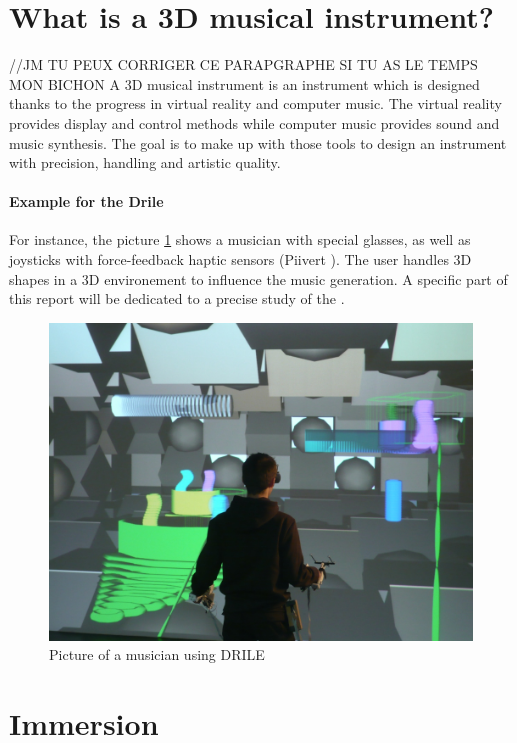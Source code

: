 \newpage
\section{What is a 3D musical instrument?}
//JM TU PEUX CORRIGER CE PARAPGRAPHE SI TU AS LE TEMPS MON BICHON
A 3D musical instrument is an instrument which is designed thanks to the progress in virtual reality and computer music.
The virtual reality provides display and control methods while computer music provides sound and music synthesis. The goal is to make up with those tools to design an instrument with precision, handling and artistic quality.

\paragraph{Example for the Drile}
For instance, the picture \ref{fig:drile} shows a musician with special glasses, as well as joysticks with force-feedback haptic sensors (Piivert \cite{berthaut2010piivert}). 
The user handles 3D shapes in a 3D environement to influence the music generation. A specific part of this report will be dedicated to a precise study of the .

\begin{figure}[t]
\centering
\includegraphics[scale=0.3]{image/drile.jpg}
\caption{Picture of a musician using DRILE}
\label{fig:drile}
\end{figure}

\newpage
\section{Immersion}
